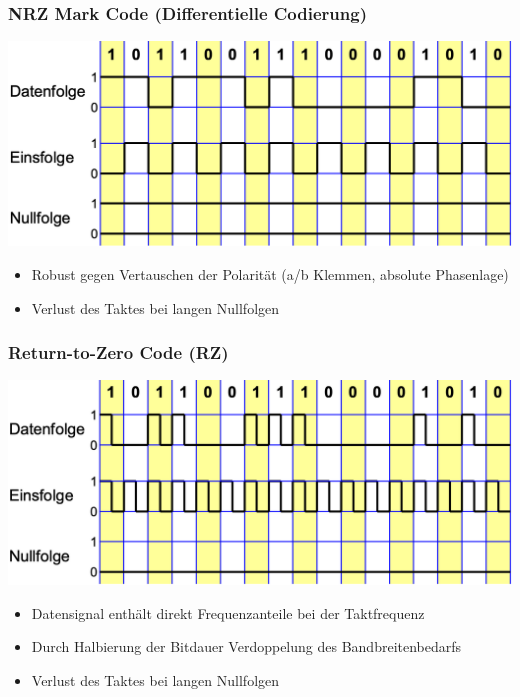 \subsubsection{NRZ Mark Code  (Differentielle Codierung)}
\begin{center}
    \includegraphics[width=\linewidth]{graphic/signale_analyisieren/NRZ Mark Code Differentielle Codierung.png}
\end{center}
\vspace{-8pt}
\begin{itemize}
    \item Robust gegen Vertauschen der Polarität (a/b Klemmen, absolute Phasenlage)
    \item Verlust des Taktes bei langen Nullfolgen
\end{itemize}


\subsubsection{Return-to-Zero Code (RZ)}
\begin{center}
    \includegraphics[width=\linewidth]{graphic/signale_analyisieren/Return-to-Zero Code (RZ).png}
\end{center}
\vspace{-8pt}
\begin{itemize}
    \item Datensignal enthält direkt Frequenzanteile bei der Taktfrequenz
    \item Durch Halbierung der Bitdauer Verdoppelung des Bandbreitenbedarfs
    \item Verlust des Taktes bei langen Nullfolgen
\end{itemize}


